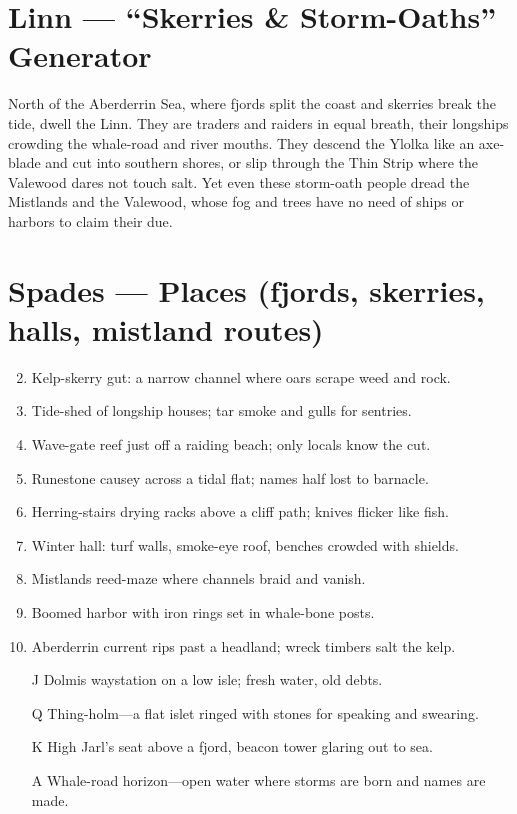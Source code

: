 \section{Linn --- ``Skerries \& Storm-Oaths'' Generator}
\label{chap:linn}

North of the Aberderrin Sea, where fjords split the coast and skerries break the tide, dwell the Linn. They are traders and raiders in equal breath, their longships crowding the whale-road and river mouths. They descend the Ylolka like an axe-blade and cut into southern shores, or slip through the Thin Strip where the Valewood dares not touch salt. Yet even these storm-oath people dread the Mistlands and the Valewood, whose fog and trees have no need of ships or harbors to claim their due.

\section*{Spades --- Places (fjords, skerries, halls, mistland routes)}
\label{sec:linn-places}
\begin{enumerate}
\setcounter{enumi}{1}
\item Kelp-skerry gut: a narrow channel where oars scrape weed and rock.
\item Tide-shed of longship houses; tar smoke and gulls for sentries.
\item Wave-gate reef just off a raiding beach; only locals know the cut.
\item Runestone causey across a tidal flat; names half lost to barnacle.
\item Herring-stairs drying racks above a cliff path; knives flicker like fish.
\item Winter hall: turf walls, smoke-eye roof, benches crowded with shields.
\item Mistlands reed-maze where channels braid and vanish.
\item Boomed harbor with iron rings set in whale-bone posts.
\item Aberderrin current rips past a headland; wreck timbers salt the kelp.
\item[J] Dolmis waystation on a low isle; fresh water, old debts.
\item[Q] Thing-holm---a flat islet ringed with stones for speaking and swearing.
\item[K] High Jarl's seat above a fjord, beacon tower glaring out to sea.
\item[A] Whale-road horizon---open water where storms are born and names are made.
\end{enumerate}

